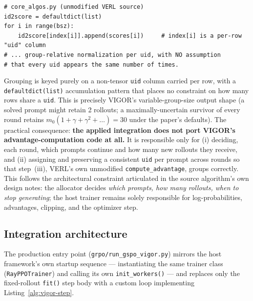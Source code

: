 \documentclass[11pt]{article}
\begin{document}
\begin{lstlisting}[caption={VERL's grpo advantage estimator, unmodified}, label=lst:grpo]
# core_algos.py (unmodified VERL source)
id2score = defaultdict(list)
for i in range(bsz):
    id2score[index[i]].append(scores[i])     # index[i] is a per-row "uid" column
# ... group-relative normalization per uid, with NO assumption
# that every uid appears the same number of times.
\end{lstlisting}

Grouping is keyed purely on a non-tensor \texttt{uid} column carried per row, with a
\texttt{defaultdict(list)} accumulation pattern that places no constraint on how many
rows share a \texttt{uid}. This is precisely VIGOR's variable-group-size output shape
(a solved prompt might retain 2 rollouts; a maximally-uncertain survivor of every
round retains $m_0(1+\gamma+\gamma^2+\dots) = 30$ under the paper's defaults). The
practical consequence: \textbf{the applied integration does not port VIGOR's
advantage-computation code at all.} It is responsible only for (i) deciding, each
round, which prompts continue and how many new rollouts they receive, and (ii)
assigning and preserving a consistent \texttt{uid} per prompt across rounds so that
step~(iii), VERL's own unmodified \texttt{compute\_advantage}, groups correctly. This
follows the architectural constraint articulated in the source algorithm's own
design notes: the allocator decides \emph{which prompts, how many rollouts, when to
stop generating}; the host trainer remains solely responsible for log-probabilities,
advantages, clipping, and the optimizer step.

\subsection{Integration architecture}

The production entry point (\texttt{grpo/run\_gspo\_vigor.py}) mirrors the host
framework's own startup sequence — instantiating the same trainer class
(\texttt{RayPPOTrainer}) and calling its own \texttt{init\_workers()} — and replaces
only the fixed-rollout \texttt{fit()} step body with a custom loop implementing
Listing~\ref{alg:vigor-step}.
\end{document}

